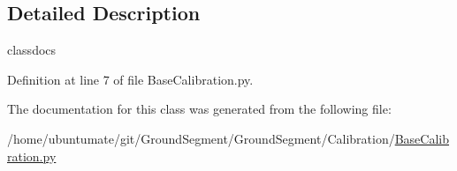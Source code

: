 \subsection{Detailed Description}
\begin{DoxyVerb}classdocs
\end{DoxyVerb}
 

Definition at line 7 of file Base\+Calibration.\+py.



The documentation for this class was generated from the following file\+:\begin{DoxyCompactItemize}
\item 
/home/ubuntumate/git/\+Ground\+Segment/\+Ground\+Segment/\+Calibration/\hyperlink{_base_calibration_8py}{Base\+Calibration.\+py}\end{DoxyCompactItemize}
